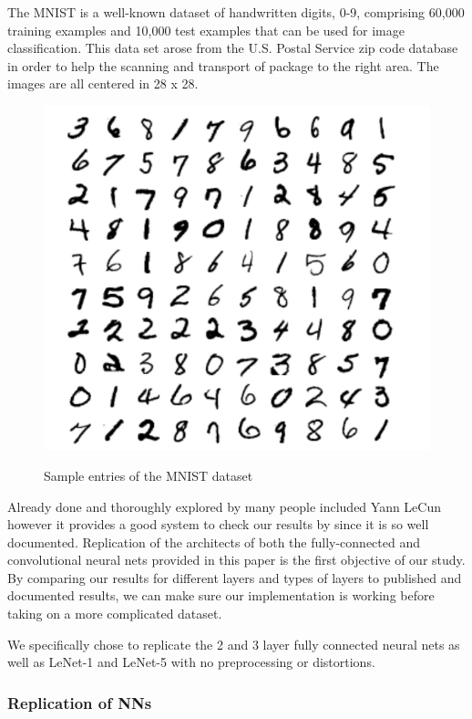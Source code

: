 \documentclass[12pt, twocolumn]{article}
\begin{document}
The MNIST is a well-known dataset of handwritten digits, 0-9, comprising 60,000 training examples and 10,000 test examples \cite{MNIST}  that can be used for image classification.  This data set arose from the U.S. Postal Service zip code database in order to help the scanning and transport of package to the right area. The images are all centered in 28 x 28.

\begin{figure}
\includegraphics[scale=.8]{MNISTnos.png}
\label{fig:MNISTex}
\caption{Sample entries of the MNIST dataset \cite{LeCun1998}}
\end{figure}

Already done and thoroughly explored by many people included Yann LeCun \cite{LeCun1998} however it provides a good system to check our results by since it is so well documented.  Replication of the architects of both the fully-connected and convolutional neural nets provided in this paper is the first objective of our study. By comparing our results  for different layers and types of layers to published and documented results, we can make sure our implementation is working before taking on a more complicated dataset. 


 We specifically chose to replicate the 2 and 3 layer fully connected neural nets as well as LeNet-1 and LeNet-5 with no preprocessing or distortions. 

\subsubsection{Replication of NNs}
\end{document}
